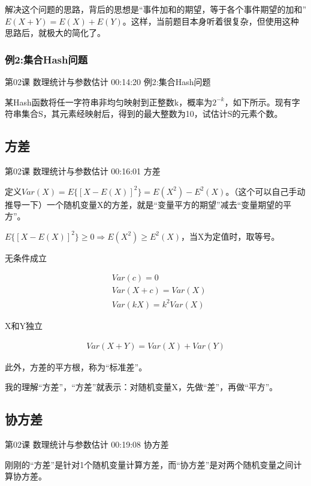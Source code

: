 \documentclass[UTF8]{ctexart}
\begin{document}
解决这个问题的思路，背后的思想是“事件加和的期望，等于各个事件期望的加和”$E(X+Y)=E(X)+E(Y)$。这样，当前题目本身听着很复杂，但使用这种思路后，就极大的简化了。

\subsubsection{例2:集合Hash问题}

第02课 数理统计与参数估计 00:14:20 例2:集合Hash问题

某Hash函数将任一字符串非均匀映射到正整数k，概率为$2^{-k}$，如下所示。现有字符串集合S，其元素经映射后，得到的最大整数为10，试估计S的元素个数。

\subsection{方差}

第02课 数理统计与参数估计 00:16:01 方差

定义$Var(X)=E\{  [X-E(X)]^{2} \}=E(X^{2})-E^{2}(X)$。（这个可以自己手动推导一下）一个随机变量X的方差，就是“变量平方的期望”减去“变量期望的平方”。

$E\{  [X-E(X)]^{2} \} \geq 0 \Rightarrow E(X^{2}) \geq E^{2}(X)$，当X为定值时，取等号。

无条件成立

\begin{equation}
\begin{aligned}
&Var(c)=0 \\
&Var(X+c)=Var(X)\\
&Var(kX)=k^{2}Var(X)
\end{aligned}
\end{equation}

X和Y独立

\begin{equation}
\begin{aligned}
Var(X+Y)=Var(X)+Var(Y)
\end{aligned}
\end{equation}

此外，方差的平方根，称为“标准差”。

我的理解“方差”，“方差”就表示：对随机变量X，先做“差”，再做“平方”。

\subsection{协方差}

第02课 数理统计与参数估计 00:19:08 协方差

刚刚的“方差”是针对1个随机变量计算方差，而“协方差”是对两个随机变量之间计算协方差。
\end{document}
